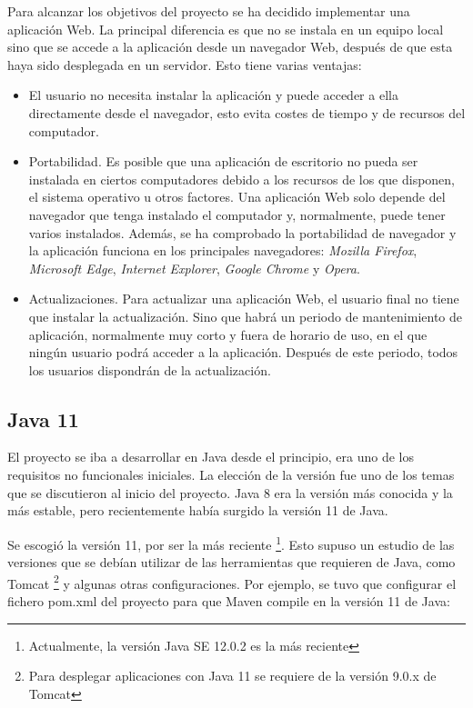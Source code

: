 Para alcanzar los objetivos del proyecto se ha decidido implementar una aplicación Web. La principal diferencia es que no se instala en un equipo local sino que se accede a la aplicación desde un navegador Web, después de que esta haya sido desplegada en un servidor. Esto tiene varias ventajas: 
\begin{itemize}
	\tightlist
	\item El usuario no necesita instalar la aplicación y puede acceder a ella directamente desde el navegador, esto evita costes de tiempo y de recursos del computador.
	\item  Portabilidad. Es posible que una aplicación de escritorio no pueda ser instalada en ciertos computadores debido a los recursos de los que disponen, el sistema operativo u otros factores. Una aplicación Web solo depende del navegador que tenga instalado el computador y, normalmente, puede tener varios instalados. Además, se ha comprobado la portabilidad de navegador y la aplicación funciona en los principales navegadores: \textit{Mozilla Firefox}, \textit{Microsoft Edge}, \textit{Internet Explorer}, \textit{Google Chrome} y \textit{Opera}.
	\item Actualizaciones. Para actualizar una aplicación Web, el usuario final no tiene que instalar la actualización. Sino que habrá un periodo de mantenimiento de aplicación, normalmente muy corto y fuera de horario de uso, en el que ningún usuario podrá acceder a la aplicación. Después de este periodo, todos los usuarios dispondrán de la actualización.
\end{itemize}

\subsection{Java 11}

El proyecto se iba a desarrollar en Java desde el principio, era uno de los requisitos no funcionales iniciales. La elección de la versión fue uno de los temas que se discutieron al inicio del proyecto. Java 8 era la versión más conocida y la más estable, pero recientemente había surgido la versión 11 de Java. 

Se escogió la versión 11, por ser la más reciente \footnote{Actualmente, la versión Java SE 12.0.2 es la más reciente}. Esto supuso un estudio de las versiones que se debían utilizar de las herramientas que requieren de Java, como Tomcat \footnote{Para desplegar aplicaciones con Java 11 se requiere de la versión 9.0.x de Tomcat} y algunas otras configuraciones. Por ejemplo, se tuvo que configurar el fichero pom.xml del proyecto para que Maven compile en la versión 11 de Java:

